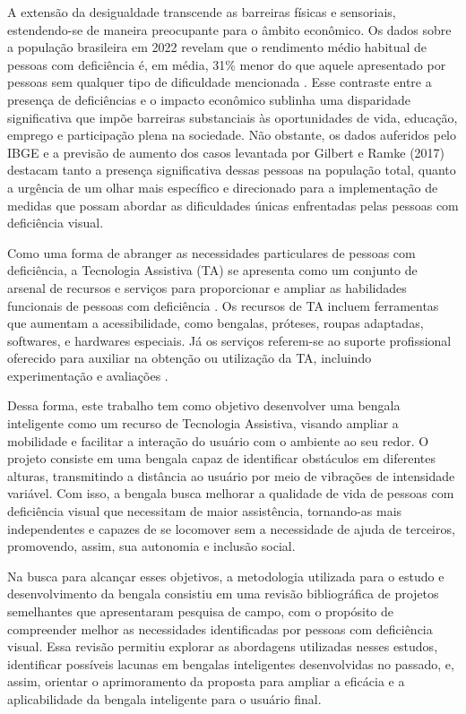 A extensão da desigualdade transcende as barreiras físicas e sensoriais, estendendo-se de maneira preocupante para o âmbito econômico. Os dados sobre a população brasileira em 2022 revelam que o rendimento médio habitual de pessoas com deficiência é, em média, 31\% menor do que aquele apresentado por pessoas sem qualquer tipo de dificuldade mencionada \cite{ibge}. Esse contraste entre a presença de deficiências e o impacto econômico sublinha uma disparidade significativa que impõe barreiras substanciais às oportunidades de vida, educação, emprego e participação plena na sociedade. Não obstante, os dados auferidos pelo IBGE e a previsão de aumento dos casos levantada por Gilbert e Ramke (2017) destacam tanto a presença significativa dessas pessoas na população total, quanto a urgência de um olhar mais específico e direcionado para a implementação de medidas que possam abordar as dificuldades únicas enfrentadas pelas pessoas com deficiência visual.


Como uma forma de abranger as necessidades particulares de pessoas com deficiência, a Tecnologia Assistiva (TA) se apresenta como um conjunto de arsenal de recursos e serviços para proporcionar e ampliar as habilidades funcionais de pessoas com deficiência \cite{introducao-ta}. Os recursos de TA incluem ferramentas que aumentam a acessibilidade, como bengalas, próteses, roupas adaptadas, softwares, e hardwares especiais. Já os serviços referem-se ao suporte profissional oferecido para auxiliar na obtenção ou utilização da TA, incluindo experimentação e avaliações \cite{bersche-tonolli-2006}.

Dessa forma, este trabalho tem como objetivo desenvolver uma bengala inteligente como um recurso de Tecnologia Assistiva, visando ampliar a mobilidade e facilitar a interação do usuário com o ambiente ao seu redor. O projeto consiste em uma bengala capaz de identificar obstáculos em diferentes alturas, transmitindo a distância ao usuário por meio de vibrações de intensidade variável. Com isso, a bengala busca melhorar a qualidade de vida de pessoas com deficiência visual que necessitam de maior assistência, tornando-as mais independentes e capazes de se locomover sem a necessidade de ajuda de terceiros, promovendo, assim, sua autonomia e inclusão social.

Na busca para alcançar esses objetivos, a metodologia utilizada para o estudo e desenvolvimento da bengala consistiu em uma revisão bibliográfica de projetos semelhantes que apresentaram pesquisa de campo, com o propósito de compreender melhor as necessidades identificadas por pessoas com deficiência visual. Essa revisão permitiu explorar as abordagens utilizadas nesses estudos, identificar possíveis lacunas em bengalas inteligentes desenvolvidas no passado, e, assim, orientar o aprimoramento da proposta para ampliar a eficácia e a aplicabilidade da bengala inteligente para o usuário final.

